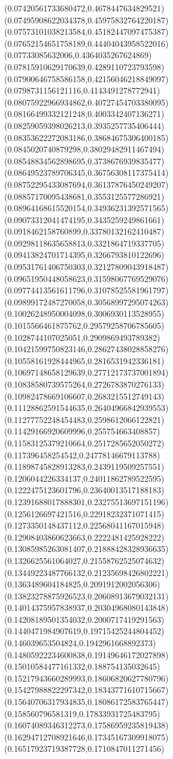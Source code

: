 {(0.07420561733680472,0.4678447634829521)
(0.07495908622034378,0.45975832764220187)
(0.07573101038213584,0.45182447097475387)
(0.07652154651758189,0.44404043958522016)
(0.07733085632006,0.4364035267624869)
(0.07815910629170639,0.4289110723793598)
(0.07900646758586158,0.42156046218849097)
(0.0798731156121116,0.4143491278772941)
(0.08075922966934862,0.40727454703380095)
(0.08166499332121248,0.4003342407136271)
(0.08259059398026213,0.3935257735406444)
(0.08353622272083186,0.38684675306400185)
(0.0845020740879298,0.38029482911467494)
(0.08548834562898695,0.3738676939835477)
(0.08649523789706345,0.36756308117375414)
(0.08752295433087694,0.36137876450249207)
(0.08857170095438681,0.3553125577286921)
(0.08964168615520154,0.34936231392571565)
(0.09073312041474195,0.3435259249861661)
(0.0918462158760899,0.33780132162410487)
(0.09298118635658813,0.3321864719337705)
(0.09413824701714395,0.3266793810122696)
(0.09531761406750303,0.32127809043918487)
(0.09651950448058623,0.31598067769529076)
(0.09774413561611796,0.31078525581961797)
(0.09899172487270058,0.30568997295074263)
(0.10026248950004098,0.3006930113528955)
(0.1015566461875762,0.29579258706785605)
(0.1028744107025051,0.2909869493789382)
(0.10421599750823146,0.28627438028858276)
(0.10558161928444965,0.2816531942336181)
(0.10697148658129639,0.27712173737001894)
(0.10838580739575264,0.2726783870276133)
(0.10982478669106607,0.2683215512749143)
(0.11128862591544635,0.26404966842939553)
(0.11277752248454483,0.2598612066122821)
(0.11429166920609996,0.255754663408857)
(0.11583125379210664,0.2517285652050272)
(0.117396458254542,0.24778146679113788)
(0.11898745828913283,0.2439119509257551)
(0.1206044226334137,0.24011862789522595)
(0.1222475123601796,0.23640013517188183)
(0.12391688017888301,0.23275513697151196)
(0.1256126697421516,0.22918232371071415)
(0.1273350148437112,0.22568041167015948)
(0.12908403860623663,0.2222481425928222)
(0.13085985263081407,0.21888428328936635)
(0.1326625561064027,0.21558762525074632)
(0.13449223487766132,0.21235698426802221)
(0.1363489604184825,0.2091912002056306)
(0.13823278875926523,0.20608913679032131)
(0.14014375957838937,0.20304968080143848)
(0.14208189501354032,0.2000717419291563)
(0.1440471984907619,0.19715425244804452)
(0.146039653504824,0.1942961668892373)
(0.14805922234600838,0.19149646172027898)
(0.15010584477161332,0.188754135032645)
(0.15217943660289993,0.18606820627780796)
(0.15427988822297342,0.18343771610715667)
(0.15640706317934835,0.18086172583765447)
(0.158560796581319,0.17833931725483795)
(0.16074089346312273,0.17586959235819438)
(0.16294712708921646,0.17345167309918075)
(0.16517923719387728,0.1710847011271456)
}
